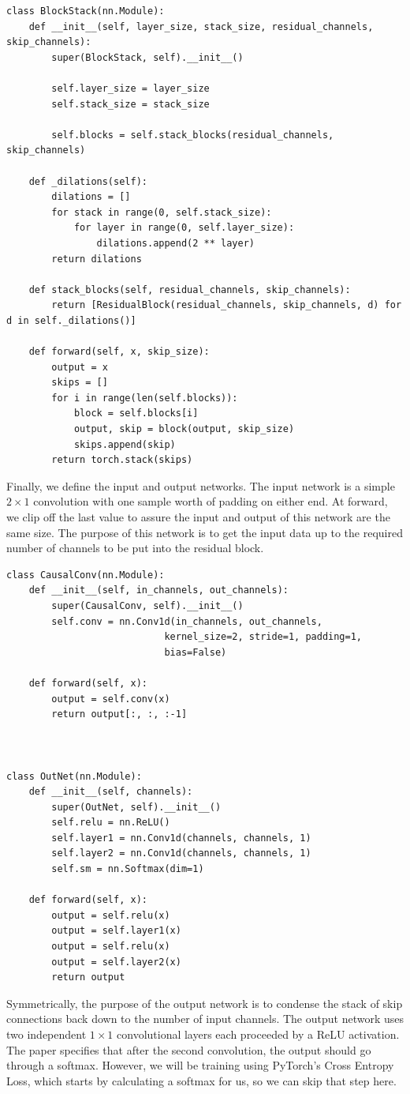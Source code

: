 \begin{verbatim}
class BlockStack(nn.Module):
    def __init__(self, layer_size, stack_size, residual_channels, skip_channels):
        super(BlockStack, self).__init__()

        self.layer_size = layer_size
        self.stack_size = stack_size

        self.blocks = self.stack_blocks(residual_channels, skip_channels)

    def _dilations(self):
        dilations = []
        for stack in range(0, self.stack_size):
            for layer in range(0, self.layer_size):
                dilations.append(2 ** layer)
        return dilations

    def stack_blocks(self, residual_channels, skip_channels):
        return [ResidualBlock(residual_channels, skip_channels, d) for d in self._dilations()]

    def forward(self, x, skip_size):
        output = x
        skips = []
        for i in range(len(self.blocks)):
            block = self.blocks[i]
            output, skip = block(output, skip_size)
            skips.append(skip)
        return torch.stack(skips)
\end{verbatim}

Finally, we define the input and output networks. The input network is a simple $2\times1$ convolution with one sample worth of padding on either end. At forward, we clip off the last value to assure the input and output of this network are the same size. The purpose of this network is to get the input data up to the required number of channels to be put into the residual block. 

\begin{verbatim}
class CausalConv(nn.Module):
    def __init__(self, in_channels, out_channels):
        super(CausalConv, self).__init__()
        self.conv = nn.Conv1d(in_channels, out_channels,
                            kernel_size=2, stride=1, padding=1,
                            bias=False)

    def forward(self, x):
        output = self.conv(x)
        return output[:, :, :-1]
        


class OutNet(nn.Module):
    def __init__(self, channels):
        super(OutNet, self).__init__()
        self.relu = nn.ReLU()
        self.layer1 = nn.Conv1d(channels, channels, 1)
        self.layer2 = nn.Conv1d(channels, channels, 1)
        self.sm = nn.Softmax(dim=1)

    def forward(self, x):
        output = self.relu(x)
        output = self.layer1(x)
        output = self.relu(x)
        output = self.layer2(x)
        return output
\end{verbatim}

Symmetrically, the purpose of the output network is to condense the stack of skip connections back down to the number of input channels. The output network uses two independent $1\times1$ convolutional layers each proceeded by a ReLU activation. The paper specifies that after the second convolution, the output should go through a softmax. However, we will be training using PyTorch's Cross Entropy Loss, which starts by calculating a softmax for us, so we can skip that step here.